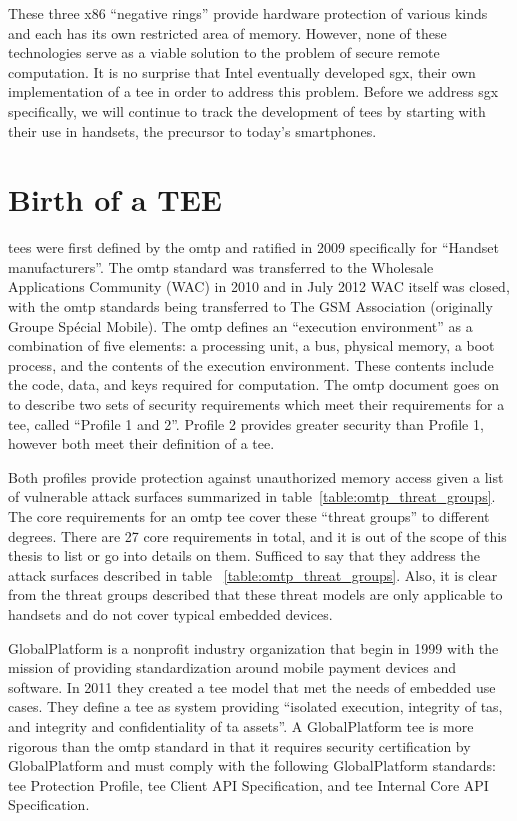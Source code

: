 These three x86 ``negative rings'' provide hardware protection of various kinds and each has its own restricted area of memory. However, none of these technologies serve as a viable solution to the problem of secure remote computation. It is no surprise that Intel eventually developed \gls{sgx}, their own implementation of a \gls{tee} in order to address this problem. Before we address \gls{sgx} specifically, we will continue to track the development of \glspl{tee} by starting with their use in handsets, the precursor to today's smartphones.

\section{Birth of a TEE}

\glspl{tee} were first defined by the \gls{omtp} and ratified in 2009 \cite{Confidential2009} specifically for ``Handset manufacturers''. The \gls{omtp} standard was transferred to the Wholesale Applications Community (WAC) in 2010 and in July 2012 WAC itself was closed, with the \gls{omtp} standards being transferred to The GSM Association (originally Groupe Sp\'ecial Mobile). \cite{WAC} The \gls{omtp} defines an ``execution environment'' as a combination of five elements: a processing unit, a bus, physical memory, a boot process, and the contents of the execution environment. \cite{Confidential2009} These contents include the code, data, and keys required for computation. The \gls{omtp} document goes on to describe two sets of security requirements which meet their requirements for a \gls{tee}, called ``Profile 1 and 2''. Profile 2 provides greater security than Profile 1, however both meet their definition of a \gls{tee}.

Both profiles provide protection against unauthorized memory access given a list of vulnerable attack surfaces summarized in table~\ref{table:omtp_threat_groups}. The core requirements for an \gls{omtp} \gls{tee} cover these ``threat groups'' to different degrees. There are 27 core requirements in total, and it is out of the scope of this thesis to list or go into details on them. Sufficed to say that they address the attack surfaces described in table ~\ref{table:omtp_threat_groups}. Also, it is clear from the threat groups described that these threat models are only applicable to handsets and do not cover typical embedded devices. 

GlobalPlatform \cite{GlobalPlatform2018} is a nonprofit industry organization that begin in 1999 with the mission of providing standardization around mobile payment devices and software. In 2011 they created a \gls{tee} model that met the needs of embedded use cases. They define a \gls{tee} as system providing ``isolated execution, integrity of \glspl{ta}, and integrity and confidentiality of \gls{ta} assets''. \cite{GlobalPlatform2018} A GlobalPlatform \gls{tee} is more rigorous than the \gls{omtp} standard in that it requires security certification by GlobalPlatform and must comply with the following GlobalPlatform standards: \gls{tee} Protection Profile, \gls{tee} Client API Specification, and \gls{tee} Internal Core API Specification.

